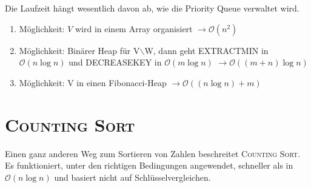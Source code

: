 \documentclass[ngerman,draft,parskip=half*,twoside]{scrreprt}
\theoremstyle{break}
\theoremstyle{nonumberbreak}
\newcommand*{\OO}{\mathcal{O}}      %
\begin{document}
Die Laufzeit hängt wesentlich davon ab, wie die Priority Queue verwaltet wird.
\begin{enumerate}
\item Möglichkeit: $V$ wird in einem Array organisiert \hfill $\rightarrow \OO(n^{2})$
\item Möglichkeit: Binärer Heap für V$\backslash$W, dann geht EXTRACTMIN in $\OO(n\log n)$ und DECREASEKEY in $\OO(m\log n)$ \hfill $\rightarrow \OO((m+n)\log n)$
\item Möglichkeit: V in einen Fibonacci-Heap \hfill $\rightarrow \OO((n \log n)+m)$
\end{enumerate} 
%
%
  \section{\textsc{Counting Sort}}
  Einen ganz anderen Weg zum Sortieren von Zahlen beschreitet \textsc{Counting Sort}.
  Es funktioniert, unter den richtigen Bedingungen angewendet, schneller als in $\OO(n \log n)$ und basiert nicht auf
  Schlüsselvergleichen.
\end{document}
